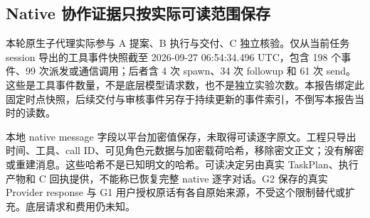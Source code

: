 \subsection{Native 协作证据只按实际可读范围保存}
本轮原生子代理实际参与 A 提案、B 执行与交付、C 独立核验。仅从当前任务 session 导出的工具事件快照截至 2026-09-27 06:54:34.496 UTC，包含 198 个事件、99 次派发或通信调用；后者含 4 次 spawn、34 次 followup 和 61 次 send。这些是工具事件数量，不是底层模型请求数，也不是独立实验次数。本报告绑定此固定时点快照，后续交付与审核事件另存于持续更新的事件索引，不倒写本报告当时的读数。

本地 native message 字段以平台加密值保存，未取得可读逐字原文。工程只导出时间、工具、call ID、可见角色元数据与加密载荷哈希，移除密文正文；没有解密或重建消息。这些哈希不是已知明文的哈希。可读决定另由真实 TaskPlan、执行产物和 C 回执提供，不能称已恢复完整 native 逐字对话。G2 保存的真实 Provider response 与 G1 用户授权原话有各自原始来源，不受这个限制替代或扩充。底层请求和费用仍未知。
